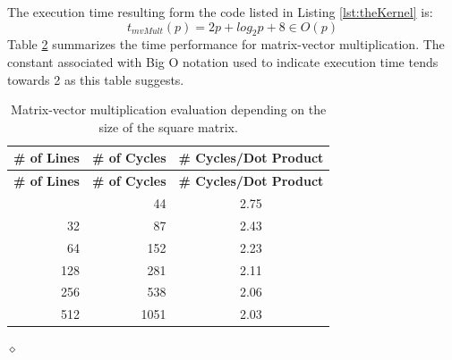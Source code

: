 \begin{exemplu}
The execution time resulting form the code listed in Listing \ref{lst:theKernel} is:
$$t_{mvMult}(p) = 2p + log_2 p + 8 \in O(p)$$
Table \ref{tab:mvPerformance} summarizes the time performance for matrix-vector multiplication. The constant associated with Big O notation used to indicate execution time tends towards 2 as this table suggests.
\begin{table}[H]
\small
\centering
\begin{longtable}{|r|r|c|}
\caption{Matrix-vector multiplication evaluation depending on the size of the square matrix.}
\label{tab:mvPerformance} \\
\hline
\textbf{\# of Lines} & \textbf{\# of Cycles} & \textbf{\# Cycles/Dot Product} \\
\hline
\endfirsthead
\hline
\textbf{\# of Lines} & \textbf{\# of Cycles} & \textbf{\# Cycles/Dot Product} \\
\hline
\endhead
\hline
\endfoot
\hline
\endlastfoot
16  & 44     & 2.75 \\ \hline
32  & 87    & 2.43 \\ \hline
64  & 152    & 2.23 \\ \hline
128 & 281   & 2.11 \\ \hline
256 & 538  & 2.06 \\ \hline
512 & 1051  & 2.03 \\ \hline
\end{longtable}
\end{table}

$\diamond$
\end{exemplu}

